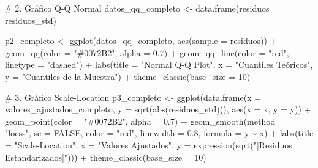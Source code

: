 \documentclass[
  letterpaper,
  DIV=11,
  numbers=noendperiod]{scrreprt}
\newenvironment{Shaded}{\begin{snugshade}}{\end{snugshade}}
\newcommand{\AttributeTok}[1]{\textcolor[rgb]{0.40,0.45,0.13}{#1}}
\newcommand{\CommentTok}[1]{\textcolor[rgb]{0.37,0.37,0.37}{#1}}
\newcommand{\ConstantTok}[1]{\textcolor[rgb]{0.56,0.35,0.01}{#1}}
\newcommand{\DecValTok}[1]{\textcolor[rgb]{0.68,0.00,0.00}{#1}}
\newcommand{\FloatTok}[1]{\textcolor[rgb]{0.68,0.00,0.00}{#1}}
\newcommand{\FunctionTok}[1]{\textcolor[rgb]{0.28,0.35,0.67}{#1}}
\newcommand{\NormalTok}[1]{\textcolor[rgb]{0.00,0.23,0.31}{#1}}
\newcommand{\OtherTok}[1]{\textcolor[rgb]{0.00,0.23,0.31}{#1}}
\newcommand{\SpecialCharTok}[1]{\textcolor[rgb]{0.37,0.37,0.37}{#1}}
\newcommand{\StringTok}[1]{\textcolor[rgb]{0.13,0.47,0.30}{#1}}
\begin{document}
\begin{tcolorbox}
\begin{Shaded}
\begin{Highlighting}[]
\CommentTok{\# 2. Gráfico Q{-}Q Normal}
\NormalTok{datos\_qq\_completo }\OtherTok{\textless{}{-}} \FunctionTok{data.frame}\NormalTok{(}\AttributeTok{residuos =}\NormalTok{ residuos\_std)}

\NormalTok{p2\_completo }\OtherTok{\textless{}{-}} \FunctionTok{ggplot}\NormalTok{(datos\_qq\_completo, }\FunctionTok{aes}\NormalTok{(}\AttributeTok{sample =}\NormalTok{ residuos)) }\SpecialCharTok{+}
  \FunctionTok{geom\_qq}\NormalTok{(}\AttributeTok{color =} \StringTok{"\#0072B2"}\NormalTok{, }\AttributeTok{alpha =} \FloatTok{0.7}\NormalTok{) }\SpecialCharTok{+}
  \FunctionTok{geom\_qq\_line}\NormalTok{(}\AttributeTok{color =} \StringTok{"red"}\NormalTok{, }\AttributeTok{linetype =} \StringTok{"dashed"}\NormalTok{) }\SpecialCharTok{+}
  \FunctionTok{labs}\NormalTok{(}\AttributeTok{title =} \StringTok{"Normal Q{-}Q Plot"}\NormalTok{, }\AttributeTok{x =} \StringTok{"Cuantiles Teóricos"}\NormalTok{, }\AttributeTok{y =} \StringTok{"Cuantiles de la Muestra"}\NormalTok{) }\SpecialCharTok{+}
  \FunctionTok{theme\_classic}\NormalTok{(}\AttributeTok{base\_size =} \DecValTok{10}\NormalTok{)}

\CommentTok{\# 3. Gráfico Scale{-}Location}
\NormalTok{p3\_completo }\OtherTok{\textless{}{-}} \FunctionTok{ggplot}\NormalTok{(}\FunctionTok{data.frame}\NormalTok{(}\AttributeTok{x =}\NormalTok{ valores\_ajustados\_completo, }
                                 \AttributeTok{y =} \FunctionTok{sqrt}\NormalTok{(}\FunctionTok{abs}\NormalTok{(residuos\_std))), }
                      \FunctionTok{aes}\NormalTok{(}\AttributeTok{x =}\NormalTok{ x, }\AttributeTok{y =}\NormalTok{ y)) }\SpecialCharTok{+}
  \FunctionTok{geom\_point}\NormalTok{(}\AttributeTok{color =} \StringTok{"\#0072B2"}\NormalTok{, }\AttributeTok{alpha =} \FloatTok{0.7}\NormalTok{) }\SpecialCharTok{+}
  \FunctionTok{geom\_smooth}\NormalTok{(}\AttributeTok{method =} \StringTok{"loess"}\NormalTok{, }\AttributeTok{se =} \ConstantTok{FALSE}\NormalTok{, }\AttributeTok{color =} \StringTok{"red"}\NormalTok{, }\AttributeTok{linewidth =} \FloatTok{0.8}\NormalTok{, }\AttributeTok{formula =}\NormalTok{ y }\SpecialCharTok{\textasciitilde{}}\NormalTok{ x) }\SpecialCharTok{+}
  \FunctionTok{labs}\NormalTok{(}\AttributeTok{title =} \StringTok{"Scale{-}Location"}\NormalTok{, }\AttributeTok{x =} \StringTok{"Valores Ajustados"}\NormalTok{, }
       \AttributeTok{y =} \FunctionTok{expression}\NormalTok{(}\FunctionTok{sqrt}\NormalTok{(}\StringTok{"|Residuos Estandarizados|"}\NormalTok{))) }\SpecialCharTok{+}
  \FunctionTok{theme\_classic}\NormalTok{(}\AttributeTok{base\_size =} \DecValTok{10}\NormalTok{)}


\end{Highlighting}
\end{Shaded}
\end{tcolorbox}
\end{document}
